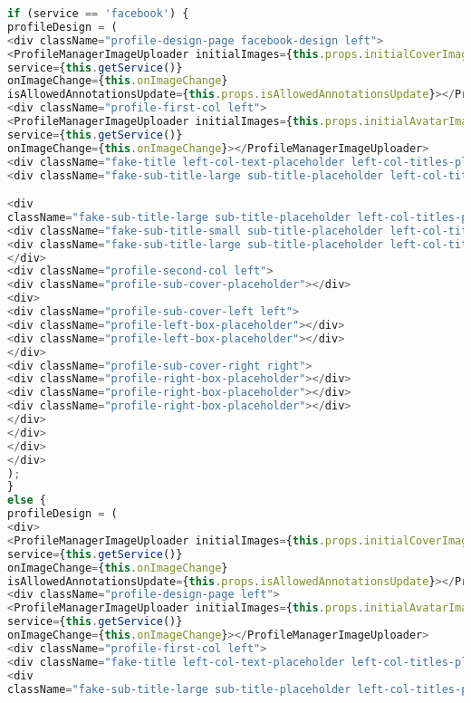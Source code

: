 \begin{lstlisting}[language=javascript]
if (service == 'facebook') {
profileDesign = (
<div className="profile-design-page facebook-design left">
<ProfileManagerImageUploader initialImages={this.props.initialCoverImage} type="cover"
service={this.getService()}
onImageChange={this.onImageChange}
isAllowedAnnotationsUpdate={this.props.isAllowedAnnotationsUpdate}></ProfileManagerImageUploader>
<div className="profile-first-col left">
<ProfileManagerImageUploader initialImages={this.props.initialAvatarImage} type="avatar"
service={this.getService()}
onImageChange={this.onImageChange}></ProfileManagerImageUploader>
<div className="fake-title left-col-text-placeholder left-col-titles-placeholder"></div>
<div className="fake-sub-title-large sub-title-placeholder left-col-titles-placeholder"></div>

<div
className="fake-sub-title-large sub-title-placeholder left-col-titles-placeholder second-paragraph"></div>
<div className="fake-sub-title-small sub-title-placeholder left-col-titles-placeholder"></div>
<div className="fake-sub-title-large sub-title-placeholder left-col-titles-placeholder"></div>
</div>
<div className="profile-second-col left">
<div className="profile-sub-cover-placeholder"></div>
<div>
<div className="profile-sub-cover-left left">
<div className="profile-left-box-placeholder"></div>
<div className="profile-left-box-placeholder"></div>
</div>
<div className="profile-sub-cover-right right">
<div className="profile-right-box-placeholder"></div>
<div className="profile-right-box-placeholder"></div>
<div className="profile-right-box-placeholder"></div>
</div>
</div>
</div>
</div>
);
}
else {
profileDesign = (
<div>
<ProfileManagerImageUploader initialImages={this.props.initialCoverImage} type="cover"
service={this.getService()}
onImageChange={this.onImageChange}
isAllowedAnnotationsUpdate={this.props.isAllowedAnnotationsUpdate}></ProfileManagerImageUploader>
<div className="profile-design-page left">
<ProfileManagerImageUploader initialImages={this.props.initialAvatarImage} type="avatar"
service={this.getService()}
onImageChange={this.onImageChange}></ProfileManagerImageUploader>
<div className="profile-first-col left">
<div className="fake-title left-col-text-placeholder left-col-titles-placeholder"></div>
<div
className="fake-sub-title-large sub-title-placeholder left-col-titles-placeholder"></div>


\end{lstlisting}
